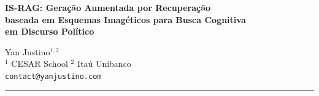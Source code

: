 \documentclass[11pt,a4paper]{article}
\begin{document}
\begin{center}
  {\Large\bfseries IS-RAG: Geração Aumentada por Recuperação\\
   baseada em Esquemas Imagéticos para Busca Cognitiva\\
   em Discurso Político}

  \vspace{0.8em}

  {\normalsize
    Yan Justino$^{1,2}$ \\[4pt]
    $^1$ CESAR School \quad $^2$ Itaú Unibanco \\[4pt]
    \texttt{contact@yanjustino.com}
  }

  \vspace{0.6em}
  \rule{\linewidth}{0.4pt}
\end{center}
\end{document}
